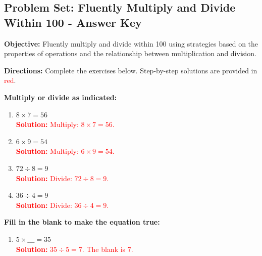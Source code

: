 \documentclass[12pt]{article}
\title{}
\date{}
\begin{document}
\subsection*{Problem Set: Fluently Multiply and Divide Within 100 - Answer Key}
\onehalfspacing

\begin{tcolorbox}[colframe=black!40, colback=gray!5, 
coltitle=black, colbacktitle=black!20, fonttitle=\bfseries\Large, 
title=Learning Objective, halign title=center, left=5pt, right=5pt, top=5pt, bottom=15pt]
\textbf{Objective:} Fluently multiply and divide within 100 using strategies based on the properties of operations and the relationship between multiplication and division.
\end{tcolorbox}

\begin{tcolorbox}[colframe=black!60, colback=white, 
coltitle=black, colbacktitle=black!15, fonttitle=\bfseries\Large, 
title=Exercises, halign title=center, left=10pt, right=10pt, top=10pt, bottom=60pt]
\textbf{Directions:} Complete the exercises below. Step-by-step solutions are provided in \textcolor{red}{red}.

\textbf{Multiply or divide as indicated:}
\begin{multicols}{2}
\begin{enumerate}[itemsep=.25em]
    \item \(8 \times 7 = 56\) \\
    \textcolor{red}{\textbf{Solution:} Multiply: \(8 \times 7 = 56\).}
    
    \item \(6 \times 9 = 54\) \\
    \textcolor{red}{\textbf{Solution:} Multiply: \(6 \times 9 = 54\).}
    
    \item \(72 \div 8 = 9\) \\
    \textcolor{red}{\textbf{Solution:} Divide: \(72 \div 8 = 9\).}
    
    \item \(36 \div 4 = 9\) \\
    \textcolor{red}{\textbf{Solution:} Divide: \(36 \div 4 = 9\).}
\end{enumerate}
\end{multicols}

\textbf{Fill in the blank to make the equation true:}
\begin{enumerate}[resume, itemsep=1em]
    \item \(5 \times \_\_\_ = 35\) \\
    \textcolor{red}{\textbf{Solution:} \(35 \div 5 = 7\). The blank is \(7\).}
    

\end{enumerate}
\end{tcolorbox}
\end{document}
